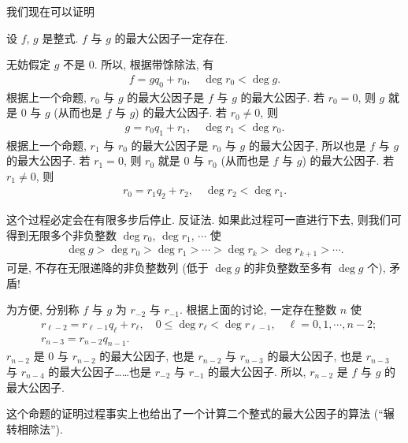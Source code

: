 我们现在可以证明
\begin{proposition}
    设 $f$, $g$ 是整式. $f$ 与 $g$ 的最大公因子一定存在.
\end{proposition}

\begin{pf}
    无妨假定 $g$ 不是 $0$. 所以, 根据带馀除法, 有
    \begin{align*}
        f = gq_0 + r_0, \quad \deg r_0 < \deg g.
    \end{align*}
    根据上一个命题, $r_0$ 与 $g$ 的最大公因子是 $f$ 与 $g$ 的最大公因子. 若 $r_0 = 0$, 则 $g$ 就是 $0$ 与 $g$ (从而也是 $f$ 与 $g$) 的最大公因子. 若 $r_0 \neq 0$, 则
    \begin{align*}
        g = r_0 q_1 + r_1, \quad \deg r_1 < \deg r_0.
    \end{align*}
    根据上一个命题, $r_1$ 与 $r_0$ 的最大公因子是 $r_0$ 与 $g$ 的最大公因子, 所以也是 $f$ 与 $g$ 的最大公因子. 若 $r_1 = 0$, 则 $r_0$ 就是 $0$ 与 $r_0$ (从而也是 $f$ 与 $g$) 的最大公因子. 若 $r_1 \neq 0$, 则
    \begin{align*}
        r_0 = r_1 q_2 + r_2, \quad \deg r_2 < \deg r_1.
    \end{align*}

    这个过程必定会在有限多步后停止. 反证法. 如果此过程可一直进行下去, 则我们可得到无限多个非负整数 $\deg r_0$, $\deg r_1$, $\cdots$ 使
    \begin{align*}
        \deg g > \deg r_0 > \deg r_1 > \cdots > \deg r_k > \deg r_{k+1} > \cdots.
    \end{align*}
    可是, 不存在无限递降的非负整数列 (低于 $\deg g$ 的非负整数至多有 $\deg g$ 个), 矛盾!

    为方便, 分别称 $f$ 与 $g$ 为 $r_{-2}$ 与 $r_{-1}$. 根据上面的讨论, 一定存在整数 $n$ 使
    \begin{align*}
         & r_{\ell - 2} = r_{\ell - 1} q_{\ell} + r_{\ell}, \quad 0 \leq \deg r_{\ell} < \deg r_{\ell - 1}, \quad \ell = 0,1,\cdots,n-2; \\
         & r_{n - 3} = r_{n - 2} q_{n - 1}.
    \end{align*}
    $r_{n-2}$ 是 $0$ 与 $r_{n-2}$ 的最大公因子, 也是 $r_{n-2}$ 与 $r_{n-3}$ 的最大公因子, 也是 $r_{n-3}$ 与 $r_{n-4}$ 的最大公因子……也是 $r_{-2}$ 与 $r_{-1}$ 的最大公因子. 所以, $r_{n-2}$ 是 $f$ 与 $g$ 的最大公因子.
\end{pf}

这个命题的证明过程事实上也给出了一个计算二个整式的最大公因子的算法 (``辗转相除法'').

